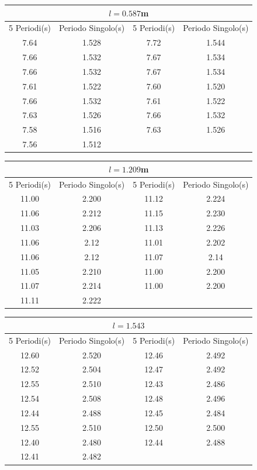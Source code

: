 \documentclass[a4paper]{article}
\begin{document}
\begin{center}
    \begin{tabular}{|c|c|c|c|}
    \hline
    \multicolumn{4}{|c|}{$l=0.587$m} \\
    \hline
    5 Periodi(s) & Periodo Singolo(s) & 5 Periodi(s) & Periodo Singolo(s) \\
    \hline
      7.64 & 1.528 & 7.72 & 1.544 \\
      7.66 & 1.532 & 7.67 & 1.534 \\
      7.66 & 1.532 & 7.67 & 1.534 \\
      7.61 & 1.522 & 7.60 & 1.520 \\
      7.66 & 1.532 & 7.61 & 1.522 \\
      7.63 & 1.526 & 7.66 & 1.532 \\
      7.58 & 1.516 & 7.63 & 1.526 \\ 
      7.56 & 1.512 &  & \\
    \hline
    \end{tabular}
\end{center}

\begin{center}
    \begin{tabular}{|c|c|c|c|}
    \hline
    \multicolumn{4}{|c|}{$l=1.209$m} \\
    \hline
    5 Periodi(s) & Periodo Singolo(s) & 5 Periodi(s) & Periodo Singolo(s) \\
    \hline
      11.00 & 2.200 & 11.12 & 2.224 \\
      11.06 & 2.212 & 11.15 & 2.230 \\
      11.03 & 2.206 & 11.13 & 2.226 \\
      11.06 & 2.12 & 11.01  & 2.202 \\
      11.06 & 2.12 & 11.07  & 2.14 \\
      11.05 & 2.210 & 11.00 & 2.200 \\
      11.07 & 2.214 & 11.00 & 2.200 \\ 
      11.11 & 2.222 & & \\
    \hline
    \end{tabular}
\end{center}

\begin{center}
    \begin{tabular}{|c|c|c|c|}
    \hline
    \multicolumn{4}{|c|}{$l=1.543$}\\
    \hline
    5 Periodi(s) & Periodo Singolo(s) & 5 Periodi(s) & Periodo Singolo(s) \\
    \hline
     12.60 & 2.520 & 12.46 & 2.492 \\
     12.52 & 2.504 & 12.47 & 2.492 \\
     12.55 & 2.510 & 12.43 & 2.486 \\
     12.54 & 2.508 & 12.48 & 2.496 \\
     12.44 & 2.488 & 12.45 & 2.484 \\
     12.55 & 2.510 & 12.50 & 2.500 \\
     12.40 & 2.480 & 12.44 & 2.488 \\
     12.41 & 2.482 & & \\
    \hline
    \end{tabular}
\end{center}
\end{document}
